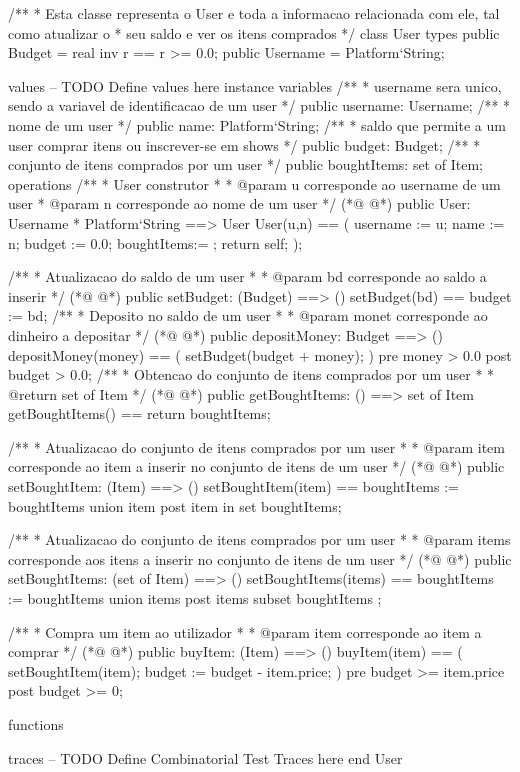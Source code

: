 \begin{vdmpp}[breaklines=true]
/**
* Esta classe representa o User e toda a informacao relacionada com ele, tal como atualizar o
* seu saldo e ver os itens comprados
*/
class User
types
 public Budget = real
  inv r == r >= 0.0;
 public Username = Platform`String;
 
values
-- TODO Define values here
instance variables
 /**
 * username sera unico, sendo a variavel de identificacao de um user
 */
 public username: Username;
 /**
 * nome de um user
 */
 public name: Platform`String;
 /**
 * saldo que permite a um user comprar itens ou inscrever-se em shows
 */
 public budget: Budget;
 /**
 * conjunto de itens comprados por um user
 */
 public boughtItems: set of Item;
operations
 /**
 * User construtor
 * 
 * @param u corresponde ao username de um user
 * @param n corresponde ao nome de um user
 */
(*@
\label{User:37}
@*)
 public User: Username * Platform`String ==> User 
 User(u,n) == 
 (
  username := u;
  name := n;
  budget := 0.0;
  boughtItems:= {};
  return self;
 );
 
 /**
 * Atualizacao do saldo de um user
 * 
 * @param bd corresponde ao saldo a inserir
 */
(*@
\label{setBudget:52}
@*)
 public setBudget: (Budget) ==> ()
  setBudget(bd) == budget := bd;
 /**
 * Deposito no saldo de um user
 * 
 * @param monet corresponde ao dinheiro a depositar
 */
(*@
\label{depositMoney:59}
@*)
 public depositMoney: Budget ==> ()
  depositMoney(money) ==
  (
   setBudget(budget + money);
  )
  pre money > 0.0
  post budget > 0.0;
 /**
 * Obtencao do conjunto de itens comprados por um user
 * 
 * @return set of Item
 */
(*@
\label{getBoughtItems:71}
@*)
 public getBoughtItems: () ==> set of Item
  getBoughtItems() == return boughtItems;
 
 /**
 * Atualizacao do conjunto de itens comprados por um user
 * 
 * @param item corresponde ao item a inserir no conjunto de itens de um user
 */
(*@
\label{setBoughtItem:79}
@*)
 public setBoughtItem: (Item) ==> ()
  setBoughtItem(item) == boughtItems := boughtItems union {item}
 post item in set boughtItems;
 
 /**
 * Atualizacao do conjunto de itens comprados por um user
 * 
 * @param items corresponde aos itens a inserir no conjunto de itens de um user
 */
(*@
\label{setBoughtItems:88}
@*)
 public setBoughtItems: (set of Item) ==> ()
  setBoughtItems(items) == boughtItems := boughtItems union items
 post items subset boughtItems ;
 
 /**
 * Compra um item ao utilizador
 *
 * @param item corresponde ao item a comprar
 */
(*@
\label{buyItem:97}
@*)
 public buyItem: (Item) ==> ()
  buyItem(item) == 
  (
   setBoughtItem(item);
   budget := budget - item.price;
  )
 pre budget >= item.price
 post budget >= 0;
 
functions
 
traces
-- TODO Define Combinatorial Test Traces here
end User
\end{vdmpp}
